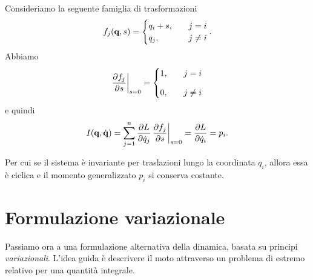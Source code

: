 \begin{example}
    Consideriamo la seguente famiglia di trasformazioni
    \begin{equation*}
        f_j(\vb{q},s) = \begin{cases}
        q_i + s,\quad &j=i\\
        q_j, \quad &j\neq i
        \end{cases}.
    \end{equation*}
    Abbiamo
    \begin{equation*}
        \pdv{f_j}{s}\bigg|_{s=0} = \begin{cases}
        \displaystyle 1, \quad &j=i\\[0.3cm]
        \displaystyle 0, \quad &j\neq i
        \end{cases}
    \end{equation*}
    e quindi
    \begin{equation*}
        I(\vb{q}, \dot{\vb{q}}) = \sum_{j=1}^n \pdv{L}{\dot{q}_j}\,\pdv{f_j}{s}\bigg|_{s=0} = \pdv{L}{\dot{q}_i} = p_i.
    \end{equation*}

    Per cui se il sistema è invariante per traslazioni lungo la coordinata $q_i$, allora essa è ciclica e il momento generalizzato $p_i$ si conserva costante.
\end{example}

\section{Formulazione variazionale}
Passiamo ora a una formulazione alternativa della dinamica, basata su principi \emph{variazionali}. L'idea guida è descrivere il moto attraverso un problema di estremo relativo per una quantità integrale.

